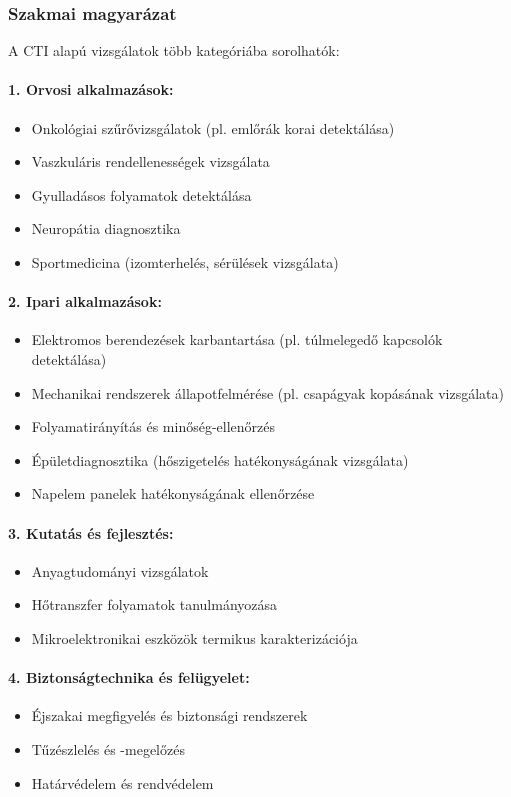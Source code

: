 \documentclass[a4paper,12pt]{article}
\begin{document}
\subsubsection{Szakmai magyarázat} A CTI alapú vizsgálatok több kategóriába sorolhatók:

\paragraph{1. Orvosi alkalmazások:} \begin{itemize} \item Onkológiai szűrővizsgálatok (pl. emlőrák korai detektálása) \item Vaszkuláris rendellenességek vizsgálata \item Gyulladásos folyamatok detektálása \item Neuropátia diagnosztika \item Sportmedicina (izomterhelés, sérülések vizsgálata) \end{itemize}

\paragraph{2. Ipari alkalmazások:} \begin{itemize} \item Elektromos berendezések karbantartása (pl. túlmelegedő kapcsolók detektálása) \item Mechanikai rendszerek állapotfelmérése (pl. csapágyak kopásának vizsgálata) \item Folyamatirányítás és minőség-ellenőrzés \item Épületdiagnosztika (hőszigetelés hatékonyságának vizsgálata) \item Napelem panelek hatékonyságának ellenőrzése \end{itemize}

\paragraph{3. Kutatás és fejlesztés:} \begin{itemize} \item Anyagtudományi vizsgálatok \item Hőtranszfer folyamatok tanulmányozása \item Mikroelektronikai eszközök termikus karakterizációja \end{itemize}

\paragraph{4. Biztonságtechnika és felügyelet:} \begin{itemize} \item Éjszakai megfigyelés és biztonsági rendszerek \item Tűzészlelés és -megelőzés \item Határvédelem és rendvédelem \end{itemize}
\end{document}
